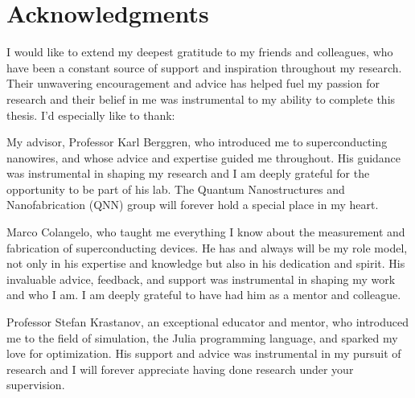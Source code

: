 \cleardoublepage
\setcounter{savepage}{\thepage}
\begin{abstractpage}

\end{abstractpage}

% 

\cleardoublepage

\section*{Acknowledgments}

I would like to extend my deepest gratitude to my friends and colleagues, who have been a constant source of support and inspiration throughout my research. Their unwavering encouragement and advice has helped fuel my passion for research and their belief in me was instrumental to my ability to complete this thesis. I’d especially like to thank:

My advisor, Professor Karl Berggren, who introduced me to superconducting nanowires, and whose advice and expertise guided me throughout. His guidance was instrumental in shaping my research and I am deeply grateful for the opportunity to be part of his lab. The Quantum Nanostructures and Nanofabrication (QNN) group will forever hold a special place in my heart.

Marco Colangelo, who taught me everything I know about the measurement and fabrication of superconducting devices. He has and always will be my role model, not only in his expertise and knowledge but also in his dedication and spirit. His invaluable advice, feedback, and support was instrumental in shaping my work and who I am. I am deeply grateful to have had him as a mentor and colleague.

Professor Stefan Krastanov, an exceptional educator and mentor, who introduced me to the field of simulation, the Julia programming language, and sparked my love for optimization. His support and advice was instrumental in my pursuit of research and I will forever appreciate having done research under your supervision.

